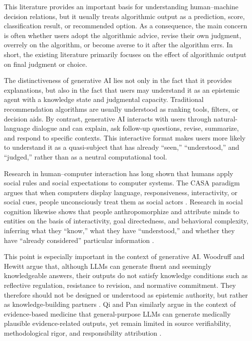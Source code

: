 This literature provides an important basis for understanding human--machine decision relations, but it usually treats algorithmic output as a prediction, score, classification result, or recommended option. As a consequence, the main concern is often whether users adopt the algorithmic advice, revise their own judgment, overrely on the algorithm, or become averse to it after the algorithm errs. In short, the existing literature primarily focuses on the effect of algorithmic output on final judgment or choice.

The distinctiveness of generative AI lies not only in the fact that it provides explanations, but also in the fact that users may understand it as an epistemic agent with a knowledge state and judgmental capacity. Traditional recommendation algorithms are usually understood as ranking tools, filters, or decision aids. By contrast, generative AI interacts with users through natural-language dialogue and can explain, ask follow-up questions, revise, summarize, and respond to specific contexts. This interactive format makes users more likely to understand it as a quasi-subject that has already ``seen,'' ``understood,'' and ``judged,'' rather than as a neutral computational tool.

Research in human--computer interaction has long shown that humans apply social rules and social expectations to computer systems. The CASA paradigm argues that when computers display language, responsiveness, interactivity, or social cues, people unconsciously treat them as social actors \citep{ReevesNass1996,NassMoon2000}. Research in social cognition likewise shows that people anthropomorphize and attribute minds to entities on the basis of interactivity, goal directedness, and behavioral complexity, inferring what they ``know,'' what they have ``understood,'' and whether they have ``already considered'' particular information \citep{EpleyWaytzCacioppo2007,Waytz2010}.

This point is especially important in the context of generative AI. Woodruff and Hewitt \citeyearpar{WoodruffHewitt2026} argue that, although LLMs can generate fluent and seemingly knowledgeable answers, their outputs do not satisfy knowledge conditions such as reflective regulation, resistance to revision, and normative commitment. They therefore should not be designed or understood as epistemic authority, but rather as knowledge-building partners \citep{WoodruffHewitt2026}. Qi and Pan \citeyearpar{QiPan2026} similarly argue in the context of evidence-based medicine that general-purpose LLMs can generate medically plausible evidence-related outputs, yet remain limited in source verifiability, methodological rigor, and responsibility attribution \citep{QiPan2026}.

